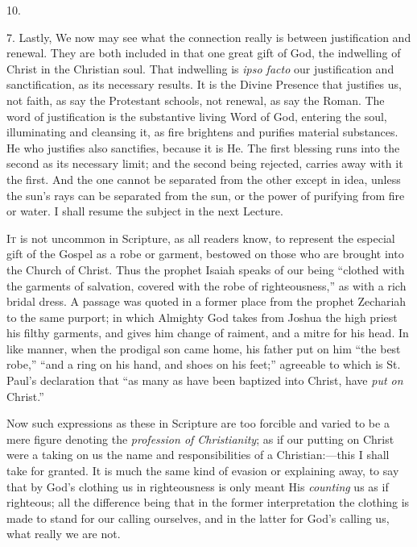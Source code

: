 10.

7. Lastly, We now may see what the connection really is between
justification and renewal. They are both included in that one great
gift of God, the indwelling of Christ in the Christian soul. That
indwelling is \emph{ipso facto} our justification and sanctification,
as its necessary results. It is the Divine Presence that justifies us,
not faith, as say the Protestant schools, not renewal, as say the
Roman. The word of justification is the substantive living Word of
God, entering the soul, illuminating and cleansing it, as fire
brightens and purifies material substances. He who justifies also
sanctifies, because it is He. The first blessing runs into the second
as its necessary limit; and the second being rejected, carries away
with it the first. And the one cannot be separated from the other
except in idea, unless the sun's rays can be separated from the sun,
or the power of purifying from fire or water. I shall resume the
subject in the next Lecture.


I\textsc{t} is not uncommon in Scripture, as all readers know, to
represent the especial gift of the Gospel as a robe or garment,
bestowed on those who are brought into the Church of Christ. Thus the
prophet Isaiah speaks of our being ``clothed with the garments of
salvation, covered with the robe of righteousness,'' as with a
rich bridal dress. A passage was quoted in a former place from the
prophet Zechariah to the same purport; in which Almighty God takes
from Joshua the high priest his filthy garments, and gives him change
of raiment, and a mitre for his head. In like manner, when the
prodigal son came home, his father put on him ``the best
robe,'' ``and a ring on his hand, and shoes on his feet;''
agreeable to which is St. Paul's declaration that ``as many as
have been baptized into Christ, have \emph{put on} Christ.''

Now such expressions as these in Scripture are too forcible and
varied to be a mere figure denoting the \emph{profession of Christianity};
as if our putting on Christ were a taking on us the name and
responsibilities of a Christian:—this I shall take for granted. It
is much the same kind of evasion or explaining away, to say that by
God's clothing us in righteousness is only meant His \emph{counting}
us as if righteous; all the difference being that in the former
interpretation the clothing is made to stand for our calling
ourselves, and in the latter for God's calling us, what really we are
not.

